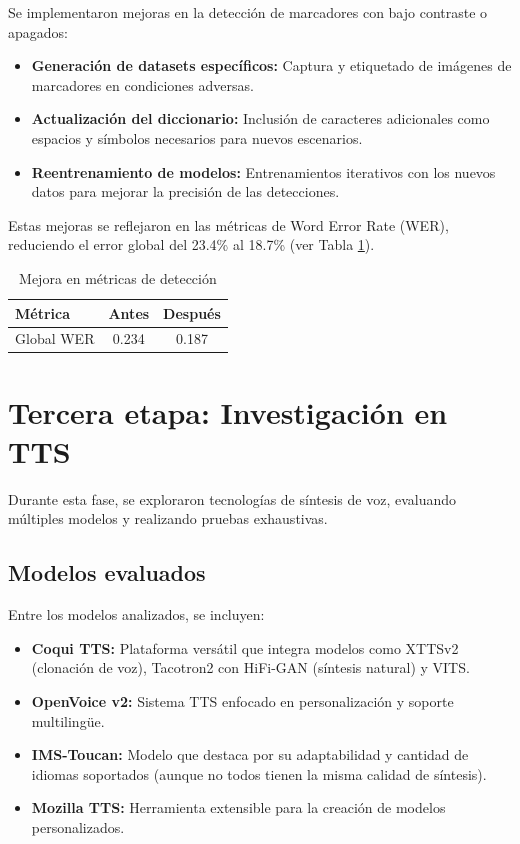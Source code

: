 Se implementaron mejoras en la detección de marcadores con bajo contraste o apagados:

\begin{itemize}
    \item \textbf{Generación de datasets específicos:} Captura y etiquetado de imágenes de marcadores en condiciones adversas.
    \item \textbf{Actualización del diccionario:} Inclusión de caracteres adicionales como espacios y símbolos necesarios para nuevos escenarios.
    \item \textbf{Reentrenamiento de modelos:} Entrenamientos iterativos con los nuevos datos para mejorar la precisión de las detecciones.
\end{itemize}

Estas mejoras se reflejaron en las métricas de Word Error Rate (WER), reduciendo el error global del 23.4\% al 18.7\% (ver Tabla \ref{tab:metricas}).

\begin{table}[h]
\centering
\begin{tabular}{|l|c|c|}
\hline
\textbf{Métrica} & \textbf{Antes} & \textbf{Después} \\
\hline
Global WER & 0.234 & 0.187 \\
\hline
\end{tabular}
\caption{Mejora en métricas de detección}
\label{tab:metricas}
\end{table}

\section{Tercera etapa: Investigación en TTS}
\label{sec:tercera_etapa}

Durante esta fase, se exploraron tecnologías de síntesis de voz, evaluando múltiples modelos y realizando pruebas exhaustivas.

\subsection{Modelos evaluados}
\label{subsec:tts_modelos}
Entre los modelos analizados, se incluyen:

\begin{itemize}
    \item \textbf{Coqui TTS:} Plataforma versátil que integra modelos como XTTSv2 (clonación de voz), Tacotron2 con HiFi-GAN (síntesis natural) y VITS.
    \item \textbf{OpenVoice v2:} Sistema TTS enfocado en personalización y soporte multilingüe.
    \item \textbf{IMS-Toucan:} Modelo que destaca por su adaptabilidad y cantidad de idiomas soportados (aunque no todos tienen la misma calidad de síntesis).
    \item \textbf{Mozilla TTS:} Herramienta extensible para la creación de modelos personalizados.
\end{itemize}

